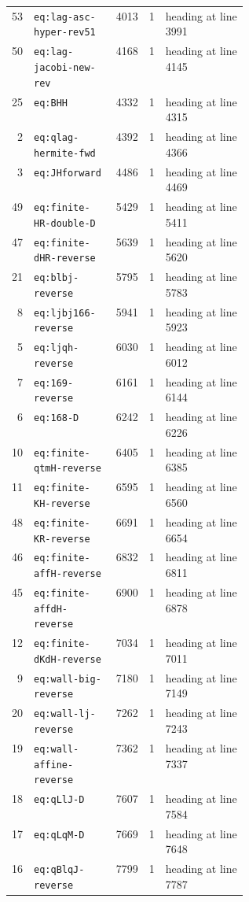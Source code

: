 \documentclass[11pt]{article}
\begin{document}
\begin{longtable}{@{}r l r r p{0.35\linewidth}@{}}
53 & \texttt{eq:lag-asc-hyper-rev51} & 4013 & 1 & heading at line 3991 \\
50 & \texttt{eq:lag-jacobi-new-rev} & 4168 & 1 & heading at line 4145 \\
25 & \texttt{eq:BHH} & 4332 & 1 & heading at line 4315 \\
2 & \texttt{eq:qlag-hermite-fwd} & 4392 & 1 & heading at line 4366 \\
3 & \texttt{eq:JHforward} & 4486 & 1 & heading at line 4469 \\
49 & \texttt{eq:finite-HR-double-D} & 5429 & 1 & heading at line 5411 \\
47 & \texttt{eq:finite-dHR-reverse} & 5639 & 1 & heading at line 5620 \\
21 & \texttt{eq:blbj-reverse} & 5795 & 1 & heading at line 5783 \\
8 & \texttt{eq:ljbj166-reverse} & 5941 & 1 & heading at line 5923 \\
5 & \texttt{eq:ljqh-reverse} & 6030 & 1 & heading at line 6012 \\
7 & \texttt{eq:169-reverse} & 6161 & 1 & heading at line 6144 \\
6 & \texttt{eq:168-D} & 6242 & 1 & heading at line 6226 \\
10 & \texttt{eq:finite-qtmH-reverse} & 6405 & 1 & heading at line 6385 \\
11 & \texttt{eq:finite-KH-reverse} & 6595 & 1 & heading at line 6560 \\
48 & \texttt{eq:finite-KR-reverse} & 6691 & 1 & heading at line 6654 \\
46 & \texttt{eq:finite-affH-reverse} & 6832 & 1 & heading at line 6811 \\
45 & \texttt{eq:finite-affdH-reverse} & 6900 & 1 & heading at line 6878 \\
12 & \texttt{eq:finite-dKdH-reverse} & 7034 & 1 & heading at line 7011 \\
9 & \texttt{eq:wall-big-reverse} & 7180 & 1 & heading at line 7149 \\
20 & \texttt{eq:wall-lj-reverse} & 7262 & 1 & heading at line 7243 \\
19 & \texttt{eq:wall-affine-reverse} & 7362 & 1 & heading at line 7337 \\
18 & \texttt{eq:qLlJ-D} & 7607 & 1 & heading at line 7584 \\
17 & \texttt{eq:qLqM-D} & 7669 & 1 & heading at line 7648 \\
16 & \texttt{eq:qBlqJ-reverse} & 7799 & 1 & heading at line 7787 \\

\end{longtable}
\end{document}
